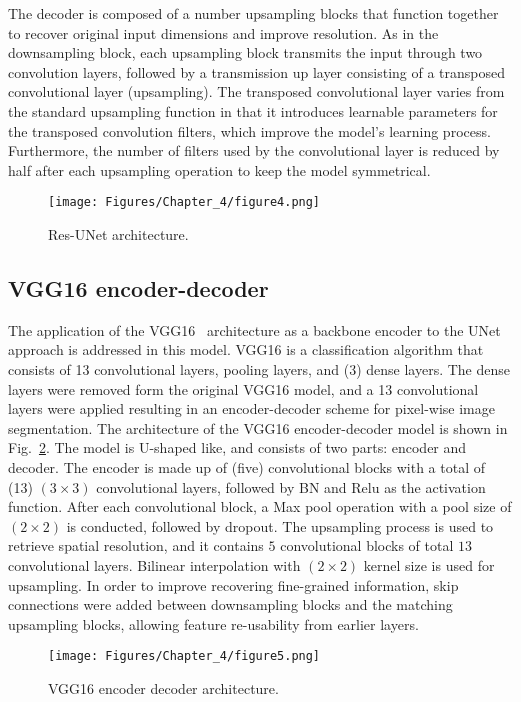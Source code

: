 The decoder is composed of a number upsampling blocks that function together to recover original input dimensions and improve resolution.
As in the downsampling block, each upsampling block transmits the input through two convolution layers, followed by a transmission up layer consisting of a transposed convolutional layer (upsampling).
The transposed convolutional layer varies from the standard upsampling function in that it introduces learnable parameters for the transposed convolution filters, which improve the model's learning process.
Furthermore, the number of filters used by the convolutional layer is reduced by half after each upsampling operation to keep the model symmetrical.
\begin{figure} [h!]
	\begin{center}
		\texttt{[image: Figures/Chapter\_4/figure4.png]}
	\end{center}
	\caption{Res-UNet architecture.} 
	\label{fig:Unet}
\end{figure}
\subsection{VGG16 encoder-decoder}
The application of the VGG16~\cite{Simonyan2015} architecture as a backbone encoder to the UNet~\cite{Ronneberger2015} approach is addressed in this model.
VGG16 is a classification algorithm that consists of 13 convolutional layers, pooling layers, and (3) dense layers.
The dense layers were removed form the original VGG16 model, and a 13 convolutional layers were applied resulting in an encoder-decoder scheme for pixel-wise image segmentation.
The architecture of the VGG16 encoder-decoder model is shown in Fig.~\ref{vgg16}.
The model is U-shaped like, and consists of two parts: encoder and decoder.
The encoder is made up of (five) convolutional blocks with a total of (13) \((3\times3)\) convolutional layers, followed by BN and Relu as the activation function.
After each convolutional block, a Max pool operation with a pool size of \((2\times2)\) is conducted, followed by dropout. 
The upsampling process is used to retrieve spatial resolution, and it contains \(5\) convolutional blocks of total \(13\) convolutional layers.
Bilinear interpolation with \((2\times2)\) kernel size is used for upsampling.
In order to improve recovering fine-grained information, skip connections were added between downsampling blocks and the matching upsampling blocks, allowing feature re-usability from earlier layers.
\begin{figure} [h!]
	\begin{center}
		\texttt{[image: Figures/Chapter\_4/figure5.png]}
	\end{center}
	\caption{VGG16 encoder decoder architecture.} 
	\label{vgg16}
\end{figure}

